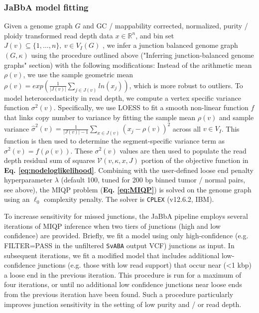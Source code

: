 \documentclass[phd,tocprelim]{cornell}
\begin{document}
\subsubsection*{JaBbA model fitting}
Given a genome graph $G$ and GC / mappability corrected, normalized, purity / ploidy transformed read depth data $x \in \mathbb{R}^n$, and bin set $J(v) \subseteq \{1, \ldots, n\},~v \in V_I(G)$ , we infer a junction balanced genome graph $(G, \kappa)$ using the procedure outlined above ("Inferring junction-balanced genome graphs" section) with the following modifications:  Instead of the arithmetic mean $\rho(v)$, we use the sample geometric mean $\rho(v) = exp(\frac{1}{|J(v)|}\sum_{j \in J(v)} ln(x_j))$, which is more robust to outliers.  To model heteroscedasticity in read depth, we compute a vertex specific variance function $\sigma^2(v)$. Specifically, we use LOESS to fit a smooth non-linear function $f$ that links copy number to variance by fitting the sample mean $\rho(v)$ and sample variance  $\hat{\sigma}^2(v) = \frac{1}{|J(v)|-1} \sum_{x \in J(v)} (x_j - \rho(v))^2$ across all $v \in V_I$.  This function is then used to determine the segment-specific variance term as $\sigma^2(v) = f(\rho(v))$.  These $\sigma^2(v)$ values are then used to populate the read depth residual sum of squares $\mathcal{V}(v, \kappa, x, J)$ portion of the objective function in \textbf{Eq. \ref{eq:nodeloglikelihood}}. Combining with the user-defined loose end penalty hyperparameter $\lambda$ (default 100, tuned for 200 bp binned tumor / normal pairs, see above), the MIQP problem (\textbf{Eq. \ref{eq:MIQP}}) is solved on the genome graph using an $\ell_0$ complexity penalty. The solver is \texttt{CPLEX} (v12.6.2, IBM).

To increase sensitivity for missed junctions, the JaBbA pipeline employs several iterations of MIQP inference when two tiers of junctions (high and low confidence) are provided.  Briefly, we fit a model using only high-confidence (e.g. FILTER=PASS in the unfiltered \texttt{SvABA} output VCF) junctions as input.  In subsequent iterations, we fit a modified model that includes additional low-confidence junctions (e.g. those with low read support) that occur near (<1 kbp) a loose end in the previous iteration.  This procedure is run for a maximum of four iterations, or until no additional low confidence junctions near loose ends from the previous iteration have been found.   Such a procedure particularly improves junction sensitivity in the setting of low purity and / or read depth.

\end{document}
